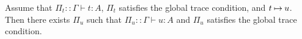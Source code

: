 \begin{theorem}\label{theorem-subject-reduction}
  Assume that $\Pi_t::\Gamma\vdash t:A$, $\Pi_t$ satisfies the global trace condition, and $t\mathbin{\mapsto} u$.
  Then there exists $\Pi_u$ such that $\Pi_u::\Gamma\vdash u:A$ and $\Pi_u$ satisfies the global trace condition. 
\end{theorem}


